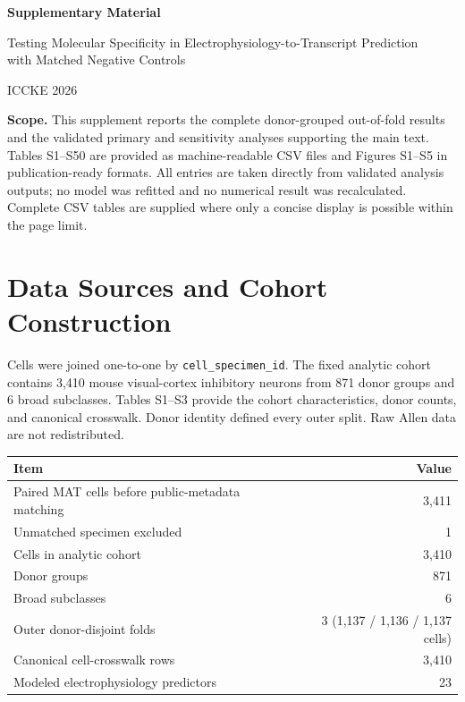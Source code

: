 \documentclass[11pt]{article}
\newcommand{\tablefont}{\fontsize{9.5}{11.2}\selectfont}
\newcommand{\sourcecaption}[1]{\Needspace{10\baselineskip}\vspace{2pt}{\small\bfseries #1}\par\vspace{2pt}}
\begin{document}
\begin{center}
{\Large\bfseries Supplementary Material}\par\vspace{3pt}
{\large Testing Molecular Specificity in Electrophysiology-to-Transcript Prediction\\with Matched Negative Controls}\par\vspace{5pt}
{\normalsize ICCKE 2026}\par
\end{center}
\vspace{-2pt}
\colorbox{boxfill}{\parbox{.965\linewidth}{\small
\textbf{Scope.} This supplement reports the complete donor-grouped out-of-fold results and the validated primary and sensitivity analyses supporting the main text. Tables S1--S50 are provided as machine-readable CSV files and Figures S1--S5 in publication-ready formats. All entries are taken directly from validated analysis outputs; no model was refitted and no numerical result was recalculated. Complete CSV tables are supplied where only a concise display is possible within the page limit.}}

\section{Data Sources and Cohort Construction}
Cells were joined one-to-one by \texttt{cell\_specimen\_id}. The fixed analytic cohort contains 3,410 mouse visual-cortex inhibitory neurons from 871 donor groups and 6 broad subclasses. Tables S1--S3 provide the cohort characteristics, donor counts, and canonical crosswalk. Donor identity defined every outer split. Raw Allen data are not redistributed.

\sourcecaption{Cohort composition, donor counts, and cell-level crosswalk (Tables S1--S3).}
\begin{center}\tablefont
\begin{tabular}{lr}
\toprule
Item & Value \\
\midrule
Paired MAT cells before public-metadata matching & 3,411 \\
Unmatched specimen excluded & 1 \\
Cells in analytic cohort & 3,410 \\
Donor groups & 871 \\
Broad subclasses & 6 \\
Outer donor-disjoint folds & 3 (1,137 / 1,136 / 1,137 cells) \\
Canonical cell-crosswalk rows & 3,410 \\
Modeled electrophysiology predictors & 23 \\
\bottomrule
\end{tabular}
\end{center}
\end{document}
